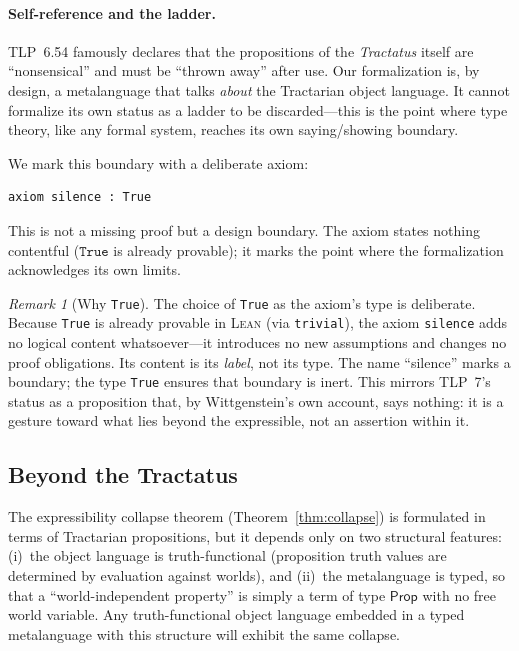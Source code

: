 \documentclass[jsl,bibother]{asl}
\theoremstyle{definition}
\theoremstyle{remark}
\newtheorem{remark}[theorem]{Remark}
\newcommand{\Prop}{\mathsf{Prop}}
\newcommand{\Lean}{\textsc{Lean}}
\begin{document}
\paragraph{Self-reference and the ladder.}
\label{sec:ladder}
TLP~6.54 famously declares that the propositions of the
\emph{Tractatus} itself are ``nonsensical'' and must be ``thrown
away'' after use.  Our formalization is, by design, a
metalanguage that talks \emph{about} the Tractarian object
language.  It cannot formalize its own status as a ladder to be
discarded---this is the point where type theory, like any formal
system, reaches its own saying/showing boundary.

We mark this boundary with a deliberate axiom:

\begin{lstlisting}
axiom silence : True
\end{lstlisting}

\noindent
This is not a missing proof but a design boundary.  The axiom
states nothing contentful ($\mathtt{True}$ is already provable);
it marks the point where the formalization acknowledges its own
limits.

\begin{remark}[Why \texttt{True}]
\label{rem:why-true}
The choice of \texttt{True} as the axiom's type is deliberate.
Because \texttt{True} is already provable in \Lean{} (via
\texttt{trivial}), the axiom \texttt{silence} adds no logical
content whatsoever---it introduces no new assumptions and
changes no proof obligations.  Its content is its \emph{label},
not its type.  The name ``silence'' marks a boundary; the
type \texttt{True} ensures that boundary is inert.  This
mirrors TLP~7's status as a proposition that, by Wittgenstein's
own account, says nothing: it is a gesture toward what lies
beyond the expressible, not an assertion within it.
\end{remark}

\subsection{Beyond the Tractatus}
\label{sec:beyond}

The expressibility collapse theorem
(Theorem~\ref{thm:collapse}) is formulated in terms of
Tractarian propositions, but it depends only on two structural
features: (i)~the object language is truth-functional
(proposition truth values are determined by evaluation against
worlds), and (ii)~the metalanguage is typed, so that a
``world-independent property'' is simply a term of type
$\Prop$ with no free world variable.  Any truth-functional
object language embedded in a typed metalanguage with this
structure will exhibit the same collapse.
\end{document}
